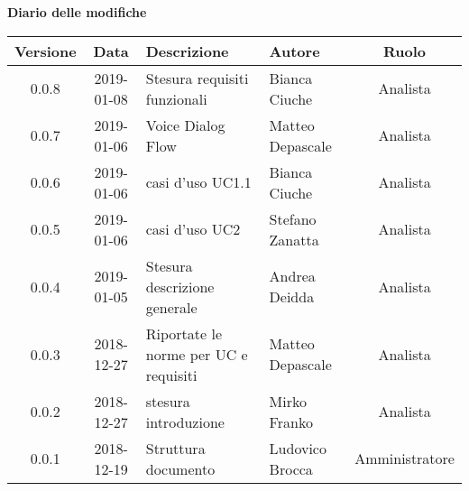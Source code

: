 	\begin{center}
		\textbf{Diario delle modifiche}
	\end{center}
	\begin{center}
		\begin{tabularx}{\textwidth}{|c|c|X|X|c|}
			\hline
			\textbf{Versione} & \textbf{Data} & \textbf{Descrizione} & \textbf{Autore} & \textbf{Ruolo} \\
			\hline
			0.0.8 & 2019-01-08 &Stesura requisiti funzionali& Bianca Ciuche& Analista\\
			\hline
			0.0.7 & 2019-01-06 & Voice Dialog Flow & Matteo Depascale & Analista\\
			\hline
			0.0.6 & 2019-01-06 & casi d'uso UC1.1& Bianca Ciuche & Analista\\
			\hline
			0.0.5 & 2019-01-06 & casi d'uso UC2& Stefano Zanatta & Analista\\
			\hline
			0.0.4 & 2019-01-05 & Stesura descrizione generale& Andrea Deidda & Analista\\
			\hline
			0.0.3 & 2018-12-27 & Riportate le norme per UC e requisiti& Matteo Depascale & Analista\\
			\hline
			0.0.2 & 2018-12-27 & stesura introduzione & Mirko Franko & Analista\\
			\hline
			0.0.1 & 2018-12-19 & Struttura documento & Ludovico Brocca & Amministratore\\
			\hline
		\end{tabularx}
	\end{center}
\newpage